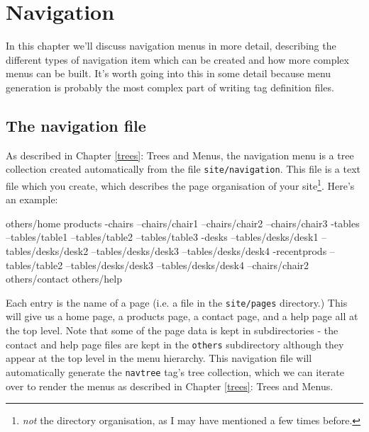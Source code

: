 %
%
%
%
%
%
% 
%
% 
% 
%

\chapter{Navigation}
\label{navig}
In this chapter we'll discuss navigation menus in more detail, describing the
different types of navigation item which can be created and how more complex
menus can be built. It's worth going into this in some detail because menu
generation is probably the most complex part of writing tag definition files.

\section{The navigation file}
As described in Chapter \ref{trees}: Trees and Menus, the navigation menu is a
tree collection created automatically from the file \texttt{site/navigation}.
This file is a text file which you create, which describes the page
organisation of your site\footnote{\emph{not} the directory organisation, as I
may have mentioned a few times before.}. Here's an example:
\begin{MyVerbatim}
others/home
products
-chairs
--chairs/chair1
--chairs/chair2
--chairs/chair3
-tables
--tables/table1
--tables/table2
--tables/table3
-desks
--tables/desks/desk1
--tables/desks/desk2
--tables/desks/desk3
--tables/desks/desk4
-recentprods
--tables/table2
--tables/desks/desk3
--tables/desks/desk4
--chairs/chair2
others/contact
others/help
\end{MyVerbatim}
Each entry is the name of a page (i.e. a file in the \texttt{site/pages}
directory.) This will give us a home page, a products page, a contact page, and
a help page all at the top level. Note that some of the page data is kept in
subdirectories - the contact and help page files are kept in the
\texttt{others} subdirectory although they appear at the top level in the menu
hierarchy. This navigation file will automatically generate the
\texttt{navtree} tag's tree collection, which we can iterate over to render
the menus as described in Chapter \ref{trees}: Trees and Menus.

